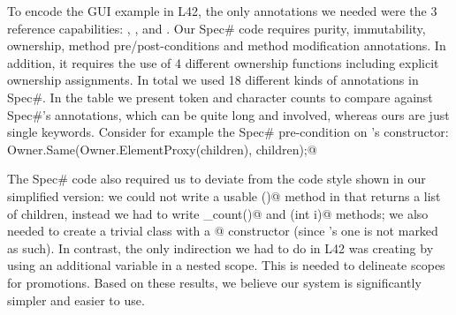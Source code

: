To encode the GUI example in L42, the only annotations we needed were the 3 reference capabilities: \Q@mut@, \Q@read@, and \Q@capsule@.
Our Spec\# code requires purity, immutability, ownership, method pre/post-conditions and method modification annotations. In addition, it requires the use of 4 different ownership functions including explicit ownership assignments. In total we used 18 different kinds of annotations in Spec\#.
In the table we present token and character counts to compare against Spec\#'s annotations, which can be quite long and involved, whereas ours are just single keywords.
Consider for example the Spec\# pre-condition on \Q@SafeMovable@'s constructor: \\
\indent\Q@requires Owner.Same(Owner.ElementProxy(children), children);@







\noindent The Spec\# code also required us to deviate from the code style shown in our simplified version: we could not write a usable \Q@children()@ method in \Q@Widget@ that returns a list of children, instead we had to write \Q@children_count()@ and \Q@children(int i)@ methods; we also needed to create a trivial class with a \Q@[Pure]@ constructor (since \Q@Object@'s one is not marked as such). In contrast, the only indirection we had to do in L42 was creating \Q@Box@es by using 
an additional variable in a nested scope.
This is needed to delineate scopes for promotions.
Based on these results, we believe our system is significantly simpler and easier to use.

